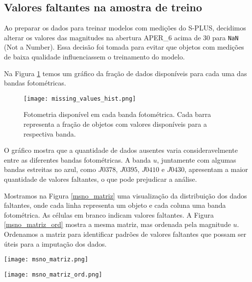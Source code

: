 \subsection{Valores faltantes na amostra de treino}\label{subsec:valores_faltantes}
Ao preparar os dados para treinar modelos com medições do S-PLUS, decidimos alterar os valores das magnitudes na abertura APER\_6 acima de 30 para \texttt{NaN} (Not a Number). Essa decisão foi tomada para evitar que objetos com medições de baixa qualidade influenciassem o treinamento do modelo.

Na Figura \ref{missing_values_hist} temos um gráfico da fração de dados disponíveis para cada uma das bandas fotométricas.

\begin{figure}[!ht]
    \begin{center}
    \texttt{[image: missing\_values\_hist.png]}
    \caption[]{Fotometria disponível em cada banda fotométrica. Cada barra representa a fração de objetos com valores disponíveis para a respectiva banda.}
    \label{missing_values_hist}
    \end{center}
\end{figure}

O gráfico mostra que a quantidade de dados ausentes varia consideravelmente entre as diferentes bandas fotométricas. A banda $u$, juntamente com algumas bandas estreitas no azul, como $J0378$, $J0395$, $J0410$ e $J0430$, apresentam a maior quantidade de valores faltantes, o que pode prejudicar a análise.

Mostramos na Figura \ref{msno_matriz} uma visualização da distribuição dos dados faltantes, onde cada linha representa um objeto e cada coluna uma banda fotométrica. As células em branco indicam valores faltantes. A Figura \ref{msno_matriz_ord} mostra a mesma matriz, mas ordenada pela magnitude $u$. Ordenamos a matriz para identificar padrões de valores faltantes que possam ser úteis para a imputação dos dados.

\begin{center}
    \begin{minipage}{0.45\textwidth}
        \centering
        \texttt{[image: msno\_matriz.png]}
        \captionsetup{}
        \label{msno_matriz}
    \end{minipage}
    \hfill
    \begin{minipage}{0.45\textwidth}
        \centering
        \texttt{[image: msno\_matriz\_ord.png]}
        \captionsetup{}
        \label{msno_matriz_ord}
    \end{minipage}
\end{center}

